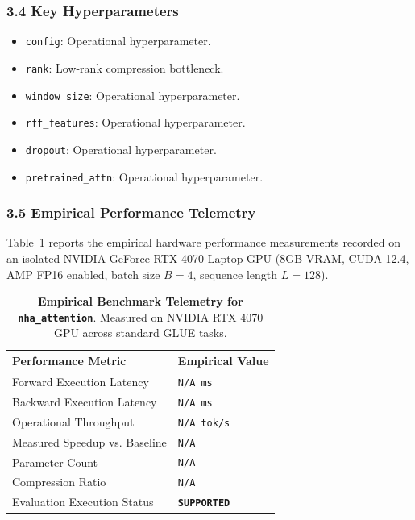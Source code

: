 \subsubsection*{3.4 Key Hyperparameters}
\begin{itemize}
    \item \texttt{config}: Operational hyperparameter.
    \item \texttt{rank}: Low-rank compression bottleneck.
    \item \texttt{window\_size}: Operational hyperparameter.
    \item \texttt{rff\_features}: Operational hyperparameter.
    \item \texttt{dropout}: Operational hyperparameter.
    \item \texttt{pretrained\_attn}: Operational hyperparameter.
\end{itemize}

\subsubsection*{3.5 Empirical Performance Telemetry}
Table~\ref{tab:telemetry_nha_attention} reports the empirical hardware performance measurements recorded on an isolated NVIDIA GeForce RTX 4070 Laptop GPU (8GB VRAM, CUDA 12.4, AMP FP16 enabled, batch size $B=4$, sequence length $L=128$).

\begin{table}[h]
\centering
\small
\caption{\textbf{Empirical Benchmark Telemetry for \texttt{nha\_attention}}. Measured on NVIDIA RTX 4070 GPU across standard GLUE tasks.}
\label{tab:telemetry_nha_attention}
\begin{tabularx}{\columnwidth}{lX}
\toprule
\textbf{Performance Metric} & \textbf{Empirical Value} \\
\midrule
Forward Execution Latency & \texttt{N/A ms} \\
Backward Execution Latency & \texttt{N/A ms} \\
Operational Throughput & \texttt{N/A tok/s} \\
Measured Speedup vs. Baseline & \texttt{N/A} \\
Parameter Count & \texttt{N/A} \\
Compression Ratio & \texttt{N/A} \\
Evaluation Execution Status & \textbf{\texttt{SUPPORTED}} \\
\bottomrule
\end{tabularx}
\end{table}

